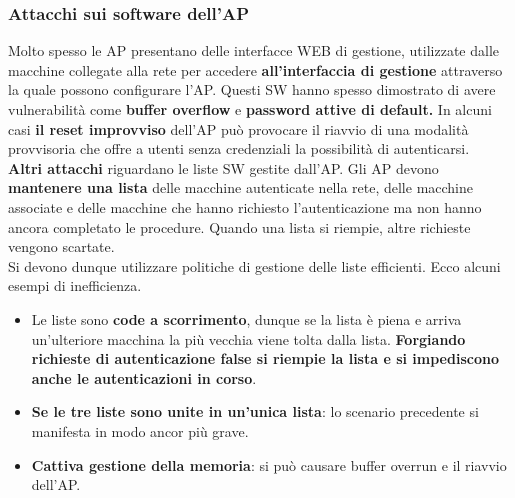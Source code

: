 \documentclass[12pt]{article}
\begin{document}
			\subsubsection{Attacchi sui software dell'AP}		
				Molto spesso le AP presentano delle interfacce WEB di gestione, utilizzate dalle macchine collegate alla rete per accedere \textbf{all'interfaccia di gestione} attraverso la quale possono configurare l'AP. Questi SW hanno spesso dimostrato di avere vulnerabilità come \textbf{buffer overflow} e \textbf{password attive di default.} In alcuni casi \textbf{il reset improvviso} dell'AP può provocare il riavvio di una modalità provvisoria che offre a utenti senza credenziali la possibilità di autenticarsi.\\
				\textbf{Altri attacchi} riguardano le liste SW gestite dall'AP.  Gli AP devono \textbf{mantenere una lista} delle macchine
				autenticate nella rete, delle macchine associate e delle
				macchine che hanno richiesto l’autenticazione ma non
				hanno ancora completato le procedure. Quando una lista
				si riempie, altre richieste vengono scartate.\\
				Si devono dunque utilizzare politiche di gestione delle liste efficienti. Ecco alcuni esempi di inefficienza.
				\begin{itemize}
					\item Le liste sono \textbf{code a scorrimento}, dunque se la lista è piena e arriva un'ulteriore macchina la più vecchia viene tolta dalla lista. \textbf{Forgiando richieste di autenticazione false si riempie la lista e si impediscono anche le autenticazioni in corso}.
					\item \textbf{Se le tre liste sono unite in un'unica lista}: lo scenario precedente si manifesta in modo ancor più grave.
					\item \textbf{Cattiva gestione della memoria}: si può causare buffer overrun e il riavvio dell'AP.
				\end{itemize}
				
\end{document}
